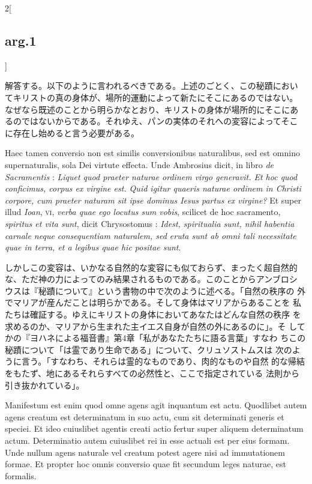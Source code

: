 \documentclass[paper=a4paper,fontsize=10pt,jafontsize=9pt,titlepage]{jlreq}
\begin{document}
\begin{paracol}{2}[\subsection{arg.1}]
\switchcolumn

解答する。以下のように言われるべきである。上述のごとく、この秘蹟におい
てキリストの真の身体が、場所的運動によって新たにそこにあるのではない。
なぜなら既述のことから明らかなとおり、キリストの身体が場所的にそこにあ
るのではないからである。それゆえ、パンの実体のそれへの変容によってそこ
に存在し始めると言う必要がある。

\switchcolumn*

Haec tamen conversio non est similis conversionibus naturalibus, sed
est omnino supernaturalis, sola Dei virtute effecta. Unde Ambrosius
dicit, in libro {\itshape de Sacramentis} : {\itshape Liquet quod
praeter naturae ordinem virgo generavit. Et hoc quod conficimus,
corpus ex virgine est. Quid igitur quaeris naturae ordinem in Christi
corpore, cum praeter naturam sit ipse dominus Iesus partus ex
virgine?} Et super illud {\itshape Ioan}, {\scshape vi}, {\itshape
verba quae ego locutus sum vobis}, scilicet de hoc sacramento,
{\itshape spiritus et vita sunt}, dicit Chrysostomus : {\itshape
Idest, spiritualia sunt, nihil habentia carnale neque consequentiam
naturalem, sed eruta sunt ab omni tali necessitate quae in terra, et a
legibus quae hic positae sunt}.

\switchcolumn

しかしこの変容は、いかなる自然的な変容にも似ておらず、まったく超自然的
な、ただ神の力によってのみ結果されるものである。このことからアンブロシ
ウスは『秘蹟について』という書物の中で次のように述べる。「自然の秩序の
外でマリアが産んだことは明らかである。そして身体はマリアからあることを
私たちは確証する。ゆえにキリストの身体においてあなたはどんな自然の秩序
を求めるのか、マリアから生まれた主イエス自身が自然の外にあるのに」。そ
してかの『ヨハネによる福音書』第4章「私があなたたちに語る言葉」すなわ
ちこの秘蹟について「は霊であり生命である」について、クリュソストムスは
次のように言う。「すなわち、それらは霊的なものであり、肉的なものや自然
的な帰結をもたず、地にあるそれらすべての必然性と、ここで指定されている
法則から引き抜かれている」。

\switchcolumn*

Manifestum est enim quod omne agens agit inquantum est actu. Quodlibet
autem agens creatum est determinatum in suo actu, cum sit determinati
generis et speciei. Et ideo cuiuslibet agentis creati actio fertur
super aliquem determinatum actum. Determinatio autem cuiuslibet rei in
esse actuali est per eius formam. Unde nullum agens naturale vel
creatum potest agere nisi ad immutationem formae.  Et propter hoc
omnis conversio quae fit secundum leges naturae, est formalis.


\end{paracol}
\end{document}
